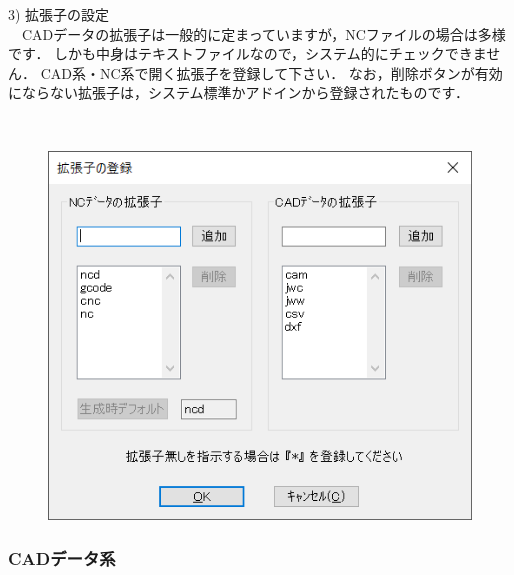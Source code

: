 \begin{minipage}[t]{0.48\textwidth}
3) 拡張子の設定\\
　CADデータの拡張子は一般的に定まっていますが，NCファイルの場合は多様です．
しかも中身はテキストファイルなので，システム的にチェックできません．
CAD系・NC系で開く拡張子を登録して下さい．
なお，削除ボタンが有効にならない拡張子は，システム標準かアドインから登録されたものです．
\end{minipage}
\begin{minipage}[t]{0.02\textwidth}
　
\end{minipage}
\begin{minipage}[t]{0.5\textwidth}
\vspace*{-2zh}
\begin{figure}[H]
\centering
\includegraphics[width=\textwidth]{No6/fig/ext.png}
\label{fig:ext.png}
\end{figure}
\end{minipage}

\subsubsection{CADデータ系}

